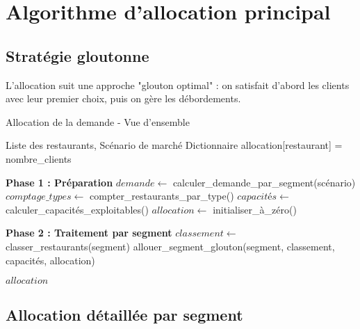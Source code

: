 \documentclass[12pt,a4paper]{article}
\begin{document}
\section{Algorithme d'allocation principal}

\subsection{Stratégie gloutonne}

L'allocation suit une approche "glouton optimal" : on satisfait d'abord les clients avec leur premier choix, puis on gère les débordements.

\begin{algorithm}[H]
\caption{Allocation de la demande - Vue d'ensemble}
\begin{algorithmic}[1]
\REQUIRE Liste des restaurants, Scénario de marché
\ENSURE Dictionnaire allocation[restaurant] = nombre\_clients

\STATE \textbf{Phase 1 : Préparation}
\STATE $demande \leftarrow$ calculer\_demande\_par\_segment(scénario)
\STATE $comptage\_types \leftarrow$ compter\_restaurants\_par\_type()
\STATE $capacités \leftarrow$ calculer\_capacités\_exploitables()
\STATE $allocation \leftarrow$ initialiser\_à\_zéro()

\STATE \textbf{Phase 2 : Traitement par segment}
    \STATE $classement \leftarrow$ classer\_restaurants(segment)
    \STATE allouer\_segment\_glouton(segment, classement, capacités, allocation)
\ENDFOR

\RETURN $allocation$
\end{algorithmic}
\end{algorithm}

\subsection{Allocation détaillée par segment}
\end{document}
